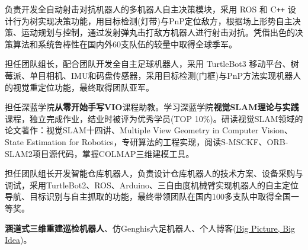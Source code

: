 \documentclass{resume}
\begin{document}
\begin{onehalfspacing}
负责开发全自动射击对抗机器人的多机器人自主决策模块，采用 ROS 和 C\texttt{++} 设计行为树实现决策功能，用目标检测(灯带)与PnP定位敌方，根据场上形势自主决策、运动规划与控制，通过发射弹丸击打敌方机器人进行射击对抗。凭借出色的决策算法和系统鲁棒性在国内外60支队伍的较量中取得全球季军。
\end{onehalfspacing}
\begin{onehalfspacing}
担任团队组长，配合团队开发全自主足球机器人，采用 TurtleBot3 移动平台、树莓派、单目相机、IMU和码盘传感器，采用目标检测(门框)与PnP方法实现机器人的视觉重定位功能，最终取得团队亚军。
\end{onehalfspacing}
\begin{onehalfspacing}
担任深蓝学院\textbf{从零开始手写VIO}课程助教。学习深蓝学院\textbf{视觉SLAM理论与实践}课程，独立完成作业，结业时被评为优秀学员(TOP 10\%)。研读视觉SLAM领域的论文著作：{视觉SLAM十四讲}、{Multiple View Geometry in Computer Vision}、{State Estimation for Robotics}，专研算法的工程实现，阅读S-MSCKF、ORB-SLAM2项目源代码，掌握COLMAP三维建模工具。
\end{onehalfspacing}
\begin{onehalfspacing}
担任团队组长开发智能仓库机器人，负责设计仓库机器人的技术方案、设备采购与调试，采用TurtleBot2、ROS、Arduino、三自由度机械臂实现机器人的自主定位导航、目标识别与自主抓取的功能，最终带领团队在国内100多支队中取得全国一等奖。
\end{onehalfspacing}
\begin{onehalfspacing}
\textbf{涵道式三维重建巡检机器人}、{仿Genghis六足机器人}、个人博客(\href{https://matheecs.tech}{Big Picture, Big Idea})。
\end{onehalfspacing}
\end{document}
